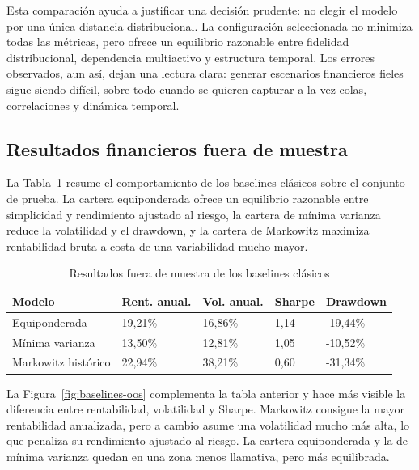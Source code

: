 \documentclass[11pt,a4paper,spanish,oneside]{book}
\numberwithin{equation}{chapter}
\numberwithin{figure}{chapter}
\begin{document}
Esta comparación ayuda a justificar una decisión prudente: no elegir el modelo por una única distancia distribucional. La configuración seleccionada no minimiza todas las métricas, pero ofrece un equilibrio razonable entre fidelidad distribucional, dependencia multiactivo y estructura temporal. Los errores observados, aun así, dejan una lectura clara: generar escenarios financieros fieles sigue siendo difícil, sobre todo cuando se quieren capturar a la vez colas, correlaciones y dinámica temporal.

\subsection{Resultados financieros fuera de muestra}

La Tabla~\ref{tab:resultados-baselines} resume el comportamiento de los baselines clásicos sobre el conjunto de prueba. La cartera equiponderada ofrece un equilibrio razonable entre simplicidad y rendimiento ajustado al riesgo, la cartera de mínima varianza reduce la volatilidad y el drawdown, y la cartera de Markowitz maximiza rentabilidad bruta a costa de una variabilidad mucho mayor.

{\small
\setlength{\tabcolsep}{3pt}
\begin{table}[H]
\centering
\begin{tabular}{|p{}|p{}|p{}|p{}|p{}|}
\hline
\textbf{Modelo} & \textbf{Rent. anual.} & \textbf{Vol. anual.} & \textbf{Sharpe} & \textbf{Drawdown} \\
\hline
Equiponderada & 19,21\% & 16,86\% & 1,14 & -19,44\% \\
\hline
Mínima varianza & 13,50\% & 12,81\% & 1,05 & -10,52\% \\
\hline
Markowitz histórico & 22,94\% & 38,21\% & 0,60 & -31,34\% \\
\hline
\end{tabular}
\caption{Resultados fuera de muestra de los baselines clásicos}\label{tab:resultados-baselines}
\end{table}
}

La Figura~\ref{fig:baselines-oos} complementa la tabla anterior y hace más visible la diferencia entre rentabilidad, volatilidad y Sharpe. Markowitz consigue la mayor rentabilidad anualizada, pero a cambio asume una volatilidad mucho más alta, lo que penaliza su rendimiento ajustado al riesgo. La cartera equiponderada y la de mínima varianza quedan en una zona menos llamativa, pero más equilibrada.
\end{document}
